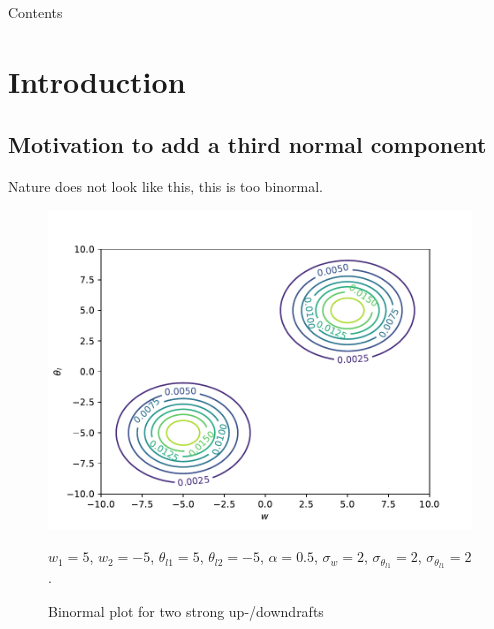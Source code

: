 \documentclass[10pt]{beamer}
\title{\mytitle}
\author[\myauthor]{\myauthor}
\institute[UWM]{University of Wisconsin Milwaukee}
\date[May 3, 2024]{May 3, 2024}
\numberwithin{equation}{section}
\begin{document}
    \frame{\titlepage}

    \begin{frame}{Contents}
        \tableofcontents[hideallsubsections]
    \end{frame}


    \section{Introduction}\label{sec:introduction}

    \subsection{Motivation to add a third normal component}
    \label{subsec:motivation-to-add-a-third-normal-component}

    \begin{frame}
        \begin{large}
            Nature does not look like this, this is too binormal.
        \end{large}
        \begin{figure}[!htb]
            \centering
            \includegraphics[width=.5\textwidth]{include/figures/plot1}
            \caption{Binormal plot for two strong up-/downdrafts}
            \label{fig:plot1}
            $w_1 = 5$, $w_2 = -5$, $\theta_{l1} = 5$, $\theta_{l2} = -5$,
            $\alpha = 0.5$, $\sigma_w = 2$, $\sigma_{\theta_{l1}} = 2$, $\sigma_{\theta_{l1}} = 2$.
        \end{figure}
    \end{frame}
\end{document}
